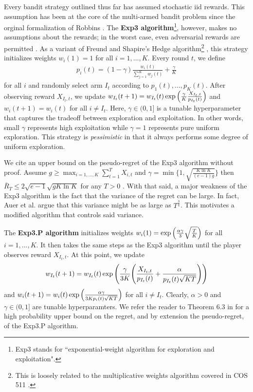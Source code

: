 \documentclass[12pt]{article}
\begin{document}
Every bandit strategy outlined thus far has assumed stochastic iid rewards. This assumption has been at the core of the multi-armed bandit problem since the orginal formalization of Robbins \cite{robbins1952}. The \textbf{Exp3 algorithm}\footnote{Exp3 stands for ``exponential-weight algorithm for exploration and exploitation".}, however, makes no assumptions about the rewards; in the worst case, even adversarial rewards are permitted \cite{auer2003}. As a variant of Freund and Shapire's Hedge algorithm\footnote{This is loosely related to the multiplicative weights algorithm covered in COS 511 \cite{lecture16}.} \cite{freund1997}, this strategy initializes weights $w_{i}(1)=1$ for all $i=1,...,K$. Every round $t$, we define
\begin{align}
p_{i}(t)=(1-\gamma)\frac{w_{i}(t)}{\sum_{j=1}^{K}w_{j}(t)}+\frac{\gamma}{K}
\end{align}
for all $i$ and randomly select arm $I_{t}$ according to $p_{1}(t),...,p_{K}(t)$. After observing reward $X_{I_{t},t}$, we update $w_{I_{t}}(t+1)=w_{I_{t}}(t)\exp\Big{(}{\frac{\gamma}{K}\frac{X_{I_{t},t}}{p_{I_{t}}(t)}}\Big{)}$ and $w_{i}(t+1)=w_{i}(t)$ for all $i\neq I_{t}$. Here, $\gamma\in(0,1]$ is a tunable hyperparameter that captures the tradeoff between exploration and exploitation. In other words, small $\gamma$ represents high exploitation while $\gamma=1$ represents pure uniform exploration. This strategy is \textit{pessimistic} in that it always performs some degree of uniform exploration.

We cite an upper bound on the pseudo-regret of the Exp3 algorithm without proof. Assume $g\geq\max_{i=1,...,K}\sum_{t=1}^{T}X_{i,t}$ and $\gamma=\min\{1,\sqrt{\frac{K\ln K}{(e-1)g}}\}$ then $\bar{R}_{T}\leq 2\sqrt{e-1}\sqrt{gK\ln K}$ for any $T>0$ \cite{auer2003}. With that said, a major weakness of the Exp3 algorithm is the fact that the variance of the regret can be large. In fact, Auer et al. argue that this variance might be as large as $T^{\frac{3}{4}}$. This motivates a modified algorithm that controls said variance.

The \textbf{Exp3.P algorithm} initializes weights $w_{i}(1)=\exp\Big{(}\frac{\alpha\gamma}{3}\sqrt{\frac{T}{K}}\Big{)}$ for all $i=1,...,K$. It then takes the same steps as the Exp3 algorithm until the player observes reward $X_{I_{t},t}$. At this point, we update
\begin{align}
w_{I_{t}}(t+1)=w_{I_{t}}(t)\exp\Bigg{(}\frac{\gamma}{3K}\Bigg{(}\frac{X_{I_{t},t}}{p_{I_{t}}(t)}+\frac{\alpha}{p_{I_{t}}(t)\sqrt{KT}}\Bigg{)}\Bigg{)}
\end{align}
and $w_{i}(t+1)=w_{i}(t)\exp\Big{(}\frac{\alpha\gamma}{3K p_{i}(t)\sqrt{KT}}\Big{)}$ for all $i\neq I_{t}$. Clearly, $\alpha>0$ and $\gamma\in(0,1]$ are tunable hyperparamters. We refer the reader to Theorem 6.3 in \cite{auer2003} for a high probability upper bound on the regret, and by extension the pseudo-regret, of the Exp3.P algorithm.
\end{document}
